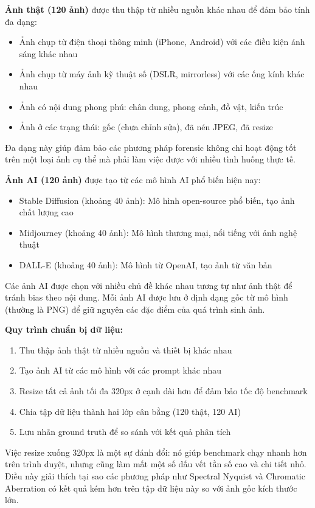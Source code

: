 \documentclass[14pt,a4paper,oneside]{report}
\begin{document}
\textbf{Ảnh thật (120 ảnh)} được thu thập từ nhiều nguồn khác nhau để đảm bảo tính đa dạng:
\begin{itemize}
  \item Ảnh chụp từ điện thoại thông minh (iPhone, Android) với các điều kiện ánh sáng khác nhau
  \item Ảnh chụp từ máy ảnh kỹ thuật số (DSLR, mirrorless) với các ống kính khác nhau
  \item Ảnh có nội dung phong phú: chân dung, phong cảnh, đồ vật, kiến trúc
  \item Ảnh ở các trạng thái: gốc (chưa chỉnh sửa), đã nén JPEG, đã resize
\end{itemize}

Đa dạng này giúp đảm bảo các phương pháp forensic không chỉ hoạt động tốt trên một loại ảnh cụ thể mà phải làm việc được với nhiều tình huống thực tế.

\textbf{Ảnh AI (120 ảnh)} được tạo từ các mô hình AI phổ biến hiện nay:
\begin{itemize}
  \item Stable Diffusion (khoảng 40 ảnh): Mô hình open-source phổ biến, tạo ảnh chất lượng cao
  \item Midjourney (khoảng 40 ảnh): Mô hình thương mại, nổi tiếng với ảnh nghệ thuật
  \item DALL-E (khoảng 40 ảnh): Mô hình từ OpenAI, tạo ảnh từ văn bản
\end{itemize}

Các ảnh AI được chọn với nhiều chủ đề khác nhau tương tự như ảnh thật để tránh bias theo nội dung. Mỗi ảnh AI được lưu ở định dạng gốc từ mô hình (thường là PNG) để giữ nguyên các đặc điểm của quá trình sinh ảnh.

\textbf{Quy trình chuẩn bị dữ liệu:}
\begin{enumerate}
  \item Thu thập ảnh thật từ nhiều nguồn và thiết bị khác nhau
  \item Tạo ảnh AI từ các mô hình với các prompt khác nhau
  \item Resize tất cả ảnh tối đa 320px ở cạnh dài hơn để đảm bảo tốc độ benchmark
  \item Chia tập dữ liệu thành hai lớp cân bằng (120 thật, 120 AI)
  \item Lưu nhãn ground truth để so sánh với kết quả phân tích
\end{enumerate}

Việc resize xuống 320px là một sự đánh đổi: nó giúp benchmark chạy nhanh hơn trên trình duyệt, nhưng cũng làm mất một số dấu vết tần số cao và chi tiết nhỏ. Điều này giải thích tại sao các phương pháp như Spectral Nyquist và Chromatic Aberration có kết quả kém hơn trên tập dữ liệu này so với ảnh gốc kích thước lớn.
\end{document}
